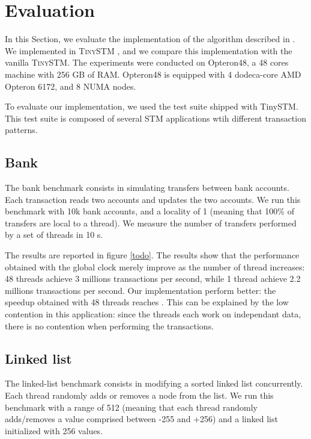 \section{Evaluation}


In this Section, we evaluate the implementation of the algorithm
described in .  We implemented  in
\textsc{TinySTM} \cite{FelberFMR10}, and we compare this implementation
with the vanilla \textsc{TinySTM}.
%
The experiments were conducted on Opteron48, a 48 cores machine with
256 GB of RAM. Opteron48 is equipped with 4 dodeca-core AMD Opteron
6172, and 8 NUMA nodes.

To evaluate our implementation, we used the test suite shipped with
TinySTM. This test suite is composed of several STM applications wtih
different transaction patterns.

\subsection{Bank}

The bank benchmark consists in simulating transfers between bank
accounts. Each transaction reads two accounts and updates the two
accounts. We run this benchmark with 10k bank accounts, and a locality
of 1 (meaning that 100\% of transfers are local to a thread). We
measure the number of transfers performed by a set of threads in 10 s.

The results are reported in figure \ref{todo}.
%
The results show that the performance obtained with the global clock
merely improve as the number of thread increases: 48 threads achieve 3
millions transactions per second, while 1 thread achieve 2.2 millions
transactions per second.
%
Our implementation perform better: the speedup obtained with 48
threads reaches . This can be explained by the low contention
in this application: since the threads each work on independant data,
there is no contention when performing the transactions.

\subsection{Linked list}

The linked-list benchmark consists in modifying a sorted linked list
concurrently. Each thread randomly adds or removes a node from the
list. We run this benchmark with a range of 512 (meaning that each
thread randomly adds/removes a value comprised between -255 and +256)
and a linked list initialized with 256 values.

